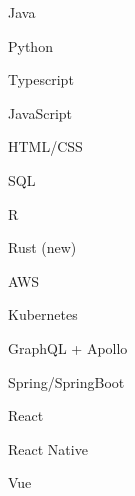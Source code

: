 \documentclass[a4paper]{deedy-resume-openfont} %
\begin{document}
\sectionheadersep
\begin{tightemize}
\item Java
\item Python
\item Typescript
\item JavaScript
\item HTML/CSS
\item SQL
\item R
\item Rust (new)
\end{tightemize}

\sectionsep
\sectionsep

\sectionheadersep
\begin{tightemize}
\item AWS
\item Kubernetes
\item GraphQL + Apollo
\item Spring/SpringBoot
\item React
\item React Native
\item Vue
\end{tightemize}
\end{document}
